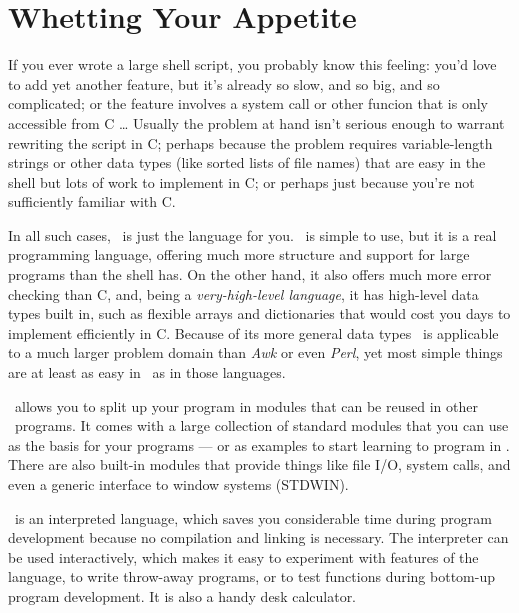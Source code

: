 \tableofcontents

\pagebreak


\section{Whetting Your Appetite}

If you ever wrote a large shell script, you probably know this feeling:
you'd love to add yet another feature, but it's already so slow, and so
big, and so complicated; or the feature involves a system call or other
funcion that is only accessible from C \ldots
Usually the problem at hand isn't serious enough to warrant rewriting
the script in C; perhaps because the problem requires variable-length
strings or other data types (like sorted lists of file names) that
are easy in the shell but lots of work to implement in C; or perhaps
just because you're not sufficiently familiar with C.

In all such cases, \Python\ is just the language for you.
\Python\ is simple to use, but it is a real programming language, offering
much more structure and support for large programs than the shell has.
On the other hand, it also offers much more error checking than C, and,
being a
{\em very-high-level language},
it has high-level data types built in, such as flexible arrays and
dictionaries that would cost you days to implement efficiently in C.
Because of its more general data types \Python\ is applicable to a
much larger problem domain than
{\em Awk}
or even
{\em Perl},
yet most simple things are at least as easy in \Python\ as in those
languages.

\Python\ allows you to split up your program in modules that can be reused
in other \Python\ programs.
It comes with a large collection of standard modules that you can use as
the basis for your programs --- or as examples to start learning to
program in \Python.
There are also built-in modules that provide things like file I/O,
system calls, and even a generic interface to window systems (STDWIN).

\Python\ is an interpreted language, which saves you considerable time
during program development because no compilation and linking is
necessary.
The interpreter can be used interactively, which makes it easy to
experiment with features of the language, to write throw-away programs,
or to test functions during bottom-up program development.
It is also a handy desk calculator.

